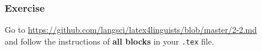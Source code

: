 %
%
%
%
%
%
%
%

\begin{frame}[fragile]
\frametitle{Exercise}


Go to \url{https://github.com/langsci/latex4linguists/blob/master/2-2.md}\\
and follow the instructions of \textbf{all blocks} in your \texttt{.tex} file.


\end{frame}


%
%
%


%
%	
%
%
%
